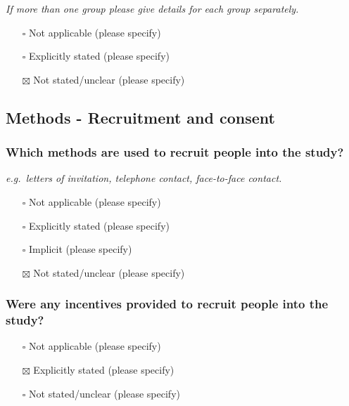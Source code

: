 \documentclass[
  doc, a4paper]{apa7}
\providecommand{\tightlist}{%
  \setlength{\itemsep}{0pt}\setlength{\parskip}{0pt}}
\begin{document}
\emph{If more than one group please give details for each group separately.}

\begin{itemize}
\tightlist
\item[$\square$]
  Not applicable (please specify)
\item[$\square$]
  Explicitly stated (please specify)
\item[$\boxtimes$]
  Not stated/unclear (please specify)
\end{itemize}

\subsection{Methods - Recruitment and consent}\label{methods---recruitment-and-consent}

\subsubsection{Which methods are used to recruit people into the study?}\label{which-methods-are-used-to-recruit-people-into-the-study}

\emph{e.g.~letters of invitation, telephone contact, face-to-face contact.}

\begin{itemize}
\tightlist
\item[$\square$]
  Not applicable (please specify)
\item[$\square$]
  Explicitly stated (please specify)
\item[$\square$]
  Implicit (please specify)
\item[$\boxtimes$]
  Not stated/unclear (please specify)
\end{itemize}

\subsubsection{Were any incentives provided to recruit people into the study?}\label{were-any-incentives-provided-to-recruit-people-into-the-study}

\begin{itemize}
\tightlist
\item[$\square$]
  Not applicable (please specify)
\item[$\boxtimes$]
  Explicitly stated (please specify)
\item[$\square$]
  Not stated/unclear (please specify)
\end{itemize}
\end{document}
